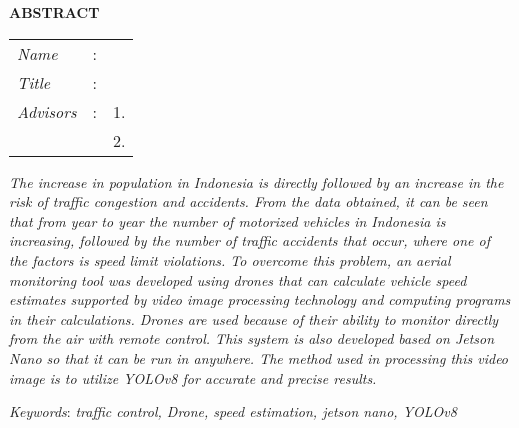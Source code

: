 \begin{center}
  \large\textbf{ABSTRACT}
\end{center}


\vspace{2ex}

\begingroup
\setlength{\tabcolsep}{0pt}

\noindent
\begin{tabularx}{\textwidth}{l >{\centering}m{3em} X}
  \emph{Name}     & : & \name{}         \\

  \emph{Title}    & : & \engtatitle{}   \\

  \emph{Advisors} & : & 1. \advisor{}   \\
                  &   & 2. \coadvisor{} \\
\end{tabularx}
\endgroup

\emph{
  The increase in population in Indonesia is directly followed by an increase in the risk of traffic congestion and accidents. From the data obtained, it can be seen that from year to year the number of motorized vehicles in Indonesia is increasing, followed by the number of traffic accidents that occur, where one of the factors is speed limit violations. To overcome this problem, an aerial monitoring tool was developed using drones that can calculate vehicle speed estimates supported by video image processing technology and computing programs in their calculations. Drones are used because of their ability to monitor directly from the air with remote control. This system is also developed based on  Jetson Nano so that it can be run in anywhere. The method used in processing this video image is to utilize YOLOv8 for accurate and precise results.}

\emph{Keywords}: \emph{traffic control, Drone, speed estimation, jetson nano, YOLOv8}
